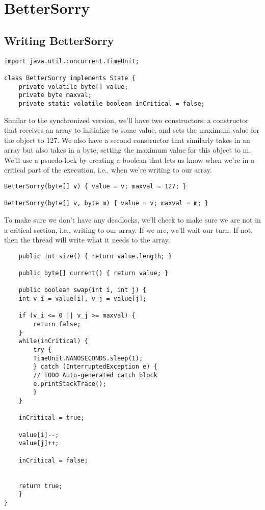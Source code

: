\documentclass[11pt]{article}
\begin{document}
\section{BetterSorry}
\label{sec-7}
\subsection{Writing BetterSorry}
\label{sec-7-1}
\begin{verbatim}
import java.util.concurrent.TimeUnit;

class BetterSorry implements State {
    private volatile byte[] value;
    private byte maxval;
    private static volatile boolean inCritical = false;
\end{verbatim}

Similar to the synchronized version, we'll have two constructors: a
constructor that receives an array to initialize to some value, and
sets the maximum value for the object to 127. We also have a second
constructor that similarly takes in an array but also takes in a
byte, setting the maximum value for this object to m. We'll use a
psuedo-lock by creating a boolean that lets us know when we're in
a critical part of the execution, i.e., when we're writing to our
array.

\begin{verbatim}
BetterSorry(byte[] v) { value = v; maxval = 127; }

BetterSorry(byte[] v, byte m) { value = v; maxval = m; }
\end{verbatim}

To make sure we don't have any deadlocks, we'll check to make
sure we are not in a critical section, i.e., writing to
our array. If we are, we'll wait our turn. If not, then the
thread will write what it needs to the array.

\begin{verbatim}
    public int size() { return value.length; }

    public byte[] current() { return value; }

    public boolean swap(int i, int j) {
	int v_i = value[i], v_j = value[j];

	if (v_i <= 0 || v_j >= maxval) {
	    return false;
	}
	while(inCritical) {
	    try {
		TimeUnit.NANOSECONDS.sleep(1);
	    } catch (InterruptedException e) {
		// TODO Auto-generated catch block
		e.printStackTrace();
	    }
	}

	inCritical = true;

	value[i]--;
	value[j]++;

	inCritical = false;


	return true;
    }
}
\end{verbatim}
\end{document}
